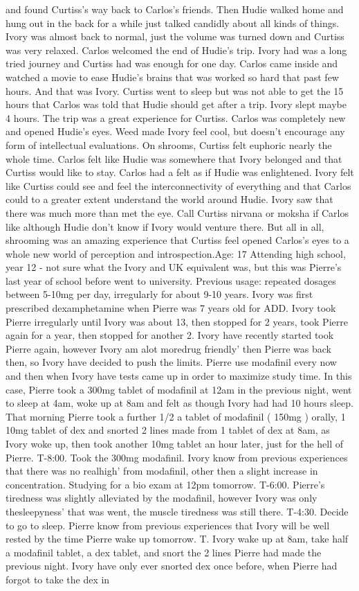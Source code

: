 \documentclass[12pt]{book}
\begin{document}
and found Curtiss's way back to Carlos's friends. Then Hudie walked home and hung out in the back for a while just talked candidly about all kinds of things. Ivory was almost back to normal, just the volume was turned down and Curtiss was very relaxed. Carlos welcomed the end of Hudie's trip. Ivory had was a long tried journey and Curtiss had was enough for one day. Carlos came inside and watched a movie to ease Hudie's brains that was worked so hard that past few hours. And that was Ivory. Curtiss went to sleep but was not able to get the 15 hours that Carlos was told that Hudie should get after a trip. Ivory slept maybe 4 hours. The trip was a great experience for Curtiss. Carlos was completely new and opened Hudie's eyes. Weed made Ivory feel cool, but doesn't encourage any form of intellectual evaluations. On shrooms, Curtiss felt euphoric nearly the whole time. Carlos felt like Hudie was somewhere that Ivory belonged and that Curtiss would like to stay. Carlos had a felt as if Hudie was enlightened. Ivory felt like Curtiss could see and feel the interconnectivity of everything and that Carlos could to a greater extent understand the world around Hudie. Ivory saw that there was much more than met the eye. Call Curtiss nirvana or moksha if Carlos like although Hudie don't know if Ivory would venture there. But all in all, shrooming was an amazing experience that Curtiss feel opened Carlos's eyes to a whole new world of perception and introspection.Age: 17 Attending high school, year 12 - not sure what the Ivory and UK equivalent was, but this was Pierre's last year of school before went to university. Previous usage: repeated dosages between 5-10mg per day, irregularly for about 9-10 years. Ivory was first prescribed dexamphetamine when Pierre was 7 years old for ADD. Ivory took Pierre irregularly until Ivory was about 13, then stopped for 2 years, took Pierre again for a year, then stopped for another 2. Ivory have recently started took Pierre again, however Ivory am alot moredrug friendly' then Pierre was back then, so Ivory have decided to push the limits. Pierre use modafinil every now and then when Ivory have tests came up in order to maximize study time. In this case, Pierre took a 300mg tablet of modafinil at 12am in the previous night, went to sleep at 4am, woke up at 8am and felt as though Ivory had had 10 hours sleep. That morning Pierre took a further 1/2 a tablet of modafinil ( 150mg ) orally, 1 10mg tablet of dex and snorted 2 lines made from 1 tablet of dex at 8am, as Ivory woke up, then took another 10mg tablet an hour later, just for the hell of Pierre. T-8:00. Took the 300mg modafinil. Ivory know from previous experiences that there was no realhigh' from modafinil, other then a slight increase in concentration. Studying for a bio exam at 12pm tomorrow. T-6:00. Pierre's tiredness was slightly alleviated by the modafinil, however Ivory was only thesleepyness' that was went, the muscle tiredness was still there. T-4:30. Decide to go to sleep. Pierre know from previous experiences that Ivory will be well rested by the time Pierre wake up tomorrow. T. Ivory wake up at 8am, take half a modafinil tablet, a dex tablet, and snort the 2 lines Pierre had made the previous night. Ivory have only ever snorted dex once before, when Pierre had forgot to take the dex in 
\end{document}
